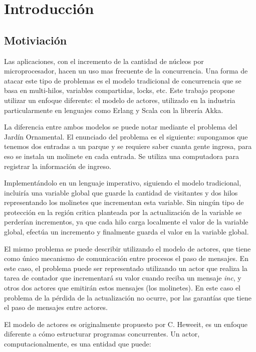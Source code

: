 \chapter{Introducción}

\section{Motiviación}

Las aplicaciones, con el incremento de la cantidad de núcleos por microprocesador, hacen un uso mas frecuente de la concurrencia. Una forma de atacar este tipo de problemas es el modelo tradicional de concurrencia que se basa en multi-hilos, variables compartidas, locks, etc. Este trabajo propone utilizar un enfoque diferente: el modelo de actores, utilizado en la industria particularmente en lenguajes como Erlang\cite{Cesarini:2009:EP:1717841} y Scala\cite{scala-overview-tech-report} con la librería Akka\cite{Wyatt:2013:AC:2663429}. 

La diferencia entre ambos modelos se puede notar mediante el problema del Jardín Ornamental. El enunciado del problema es el siguiente: supongamos que tenemos dos entradas a un parque y se requiere saber cuanta gente ingresa, para eso se instala un molinete en cada entrada. Se utiliza una computadora para registrar la información de ingreso.

Implementándolo en un lenguaje imperativo, siguiendo el modelo tradicional, incluiría una variable global que guarde la cantidad de visitantes y dos hilos representando los molinetes que incrementan esta variable. Sin ningún tipo de protección en la región critica planteada por la actualización de la variable se perderían incrementos, ya que cada hilo carga localmente el valor de la variable global, efectúa un incremento y finalmente guarda el valor en la variable global. 

El mismo problema se puede describir utilizando el modelo de actores, que tiene como único mecanismo de comunicación entre procesos el paso de mensajes. En este caso, el problema puede ser representado utilizando un actor que realiza la tarea de contador que incrementará su valor cuando reciba un mensaje \emph{inc}, y otros dos actores que emitirán estos mensajes (los molinetes). En este caso el problema de la pérdida de la actualización no ocurre, por las garantías que tiene el paso de mensajes entre actores. 

El modelo de actores es originalmente propuesto por C. Heweeit\cite{Wyatt:2013:AC:2663429}, es un enfoque diferente a cómo estructurar programas concurrentes. Un actor, computacionalmente, es una entidad que puede:

